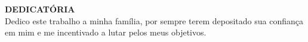 %
%

\thispagestyle{empty}
\begin{dedicatoria}
    \begin{flushright}
        \textbf{DEDICATÓRIA}\\ %
        \vspace{\baselineskip}
        Dedico este trabalho a minha família, por sempre terem depositado sua confiança em mim e me incentivado a lutar pelos meus objetivos.
    \end{flushright}

\end{dedicatoria}
